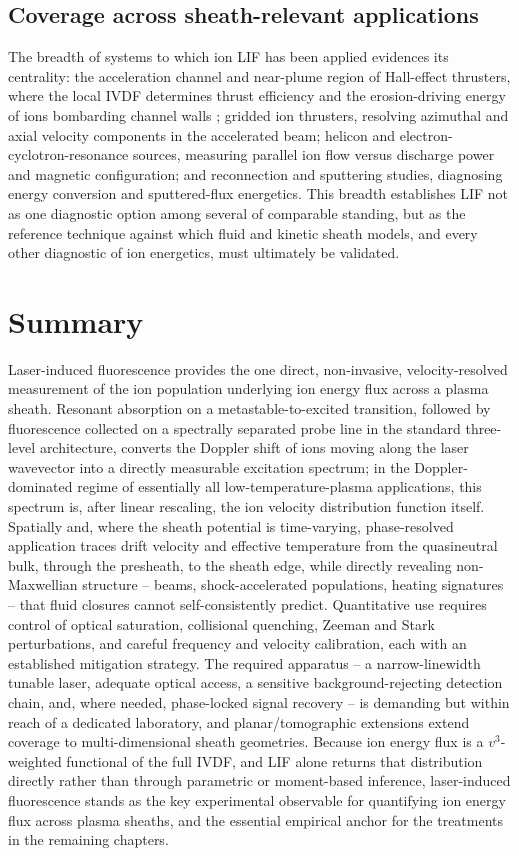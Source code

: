 \subsection{Coverage across sheath-relevant applications}

The breadth of systems to which ion LIF has been applied evidences its centrality: the acceleration channel and near-plume region of Hall-effect thrusters, where the local IVDF determines thrust efficiency and the erosion-driving energy of ions bombarding channel walls \cite{ref0322}; gridded ion thrusters, resolving azimuthal and axial velocity components in the accelerated beam; helicon and electron-cyclotron-resonance sources, measuring parallel ion flow versus discharge power and magnetic configuration; and reconnection and sputtering studies, diagnosing energy conversion and sputtered-flux energetics. This breadth establishes LIF not as one diagnostic option among several of comparable standing, but as the reference technique against which fluid and kinetic sheath models, and every other diagnostic of ion energetics, must ultimately be validated.

\section{Summary}

Laser-induced fluorescence provides the one direct, non-invasive, velocity-resolved measurement of the ion population underlying ion energy flux across a plasma sheath. Resonant absorption on a metastable-to-excited transition, followed by fluorescence collected on a spectrally separated probe line in the standard three-level architecture, converts the Doppler shift of ions moving along the laser wavevector into a directly measurable excitation spectrum; in the Doppler-dominated regime of essentially all low-temperature-plasma applications, this spectrum is, after linear rescaling, the ion velocity distribution function itself. Spatially and, where the sheath potential is time-varying, phase-resolved application traces drift velocity and effective temperature from the quasineutral bulk, through the presheath, to the sheath edge, while directly revealing non-Maxwellian structure -- beams, shock-accelerated populations, heating signatures -- that fluid closures cannot self-consistently predict. Quantitative use requires control of optical saturation, collisional quenching, Zeeman and Stark perturbations, and careful frequency and velocity calibration, each with an established mitigation strategy. The required apparatus -- a narrow-linewidth tunable laser, adequate optical access, a sensitive background-rejecting detection chain, and, where needed, phase-locked signal recovery -- is demanding but within reach of a dedicated laboratory, and planar/tomographic extensions extend coverage to multi-dimensional sheath geometries. Because ion energy flux is a $v^{3}$-weighted functional of the full IVDF, and LIF alone returns that distribution directly rather than through parametric or moment-based inference, laser-induced fluorescence stands as the key experimental observable for quantifying ion energy flux across plasma sheaths, and the essential empirical anchor for the treatments in the remaining chapters.
